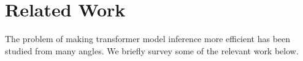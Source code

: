 \section{Related Work}
\label{related_work}

The problem of making transformer model inference more efficient has been studied from many angles. We briefly survey some of the relevant work below.


